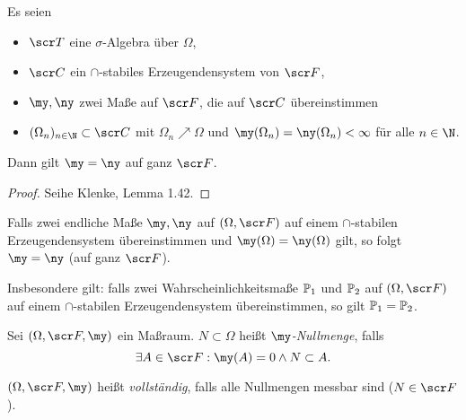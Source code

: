 \begin{st}[Eindeutigkeitssatz] \label{1.3.10}
	Es seien
	\begin{itemize}
		\item
			$\scr T$ eine $\sigma$-Algebra über $\Omega$,
		\item
			$\scr C$ ein $\cap$-stabiles Erzeugendensystem von $\scr F$,
		\item
			$\my, \ny$ zwei Maße auf $\scr F$, die auf $\scr C$ übereinstimmen
		\item
			$(\Omega_n)_{n\in\N} \subset \scr C$ mit $\Omega_n \nearrow \Omega$ und $\my(\Omega_n) = \ny(\Omega_n) < \infty$ für alle $n \in \N$.
	\end{itemize}
	Dann gilt $\my = \ny$ auf ganz $\scr F$.
	\begin{proof}
		Seihe Klenke, Lemma 1.42. %
	\end{proof}
\end{st}

\begin{kor} \label{1.3.11}
	Falls zwei endliche Maße $\my, \ny$ auf $(\Omega, \scr F)$ auf einem $\cap$-stabilen Erzeugendensystem übereinstimmen und $\my(\Omega) = \ny(\Omega)$ gilt, so folgt $\my = \ny$ (auf ganz $\scr F$).

	Insbesondere gilt: falls zwei Wahrscheinlichkeitsmaße $\P_1$ und $\P_2$ auf $(\Omega, \scr F)$ auf einem $\cap$-stabilen Erzeugendensystem übereinstimmen, so gilt $\P_1 = \P_2$.
\end{kor}

\begin{df} \label{1.3.12}
	Sei $(\Omega, \scr F, \my)$ ein Maßraum.
	$N \subset \Omega$ heißt \emph{$\my$-Nullmenge}, falls
	\[
		\exists A \in \scr F : \my(A) = 0 \land N \subset A.
	\]

	$(\Omega, \scr F, \my)$ heißt \emph{vollständig}, falls alle Nullmengen messbar sind ($N \in \scr F$).
\end{df}

